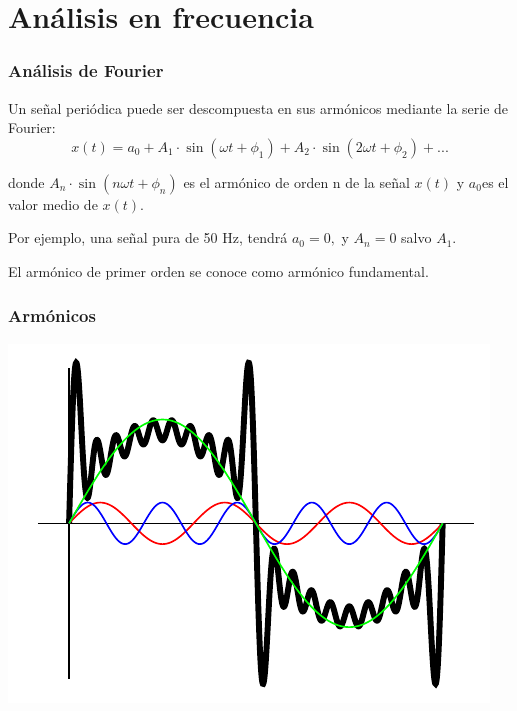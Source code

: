 \documentclass[serif, xcolor=dvipsnames]{beamer}
\begin{document}
\section{Análisis en frecuencia}

\begin{frame}
  \frametitle{Análisis de Fourier}

  Un señal periódica puede ser descompuesta en sus armónicos mediante
  la serie de Fourier:
  \[
  x(t)=a_{0}+A_{1}\cdot\sin(\omega t+\phi_{1})+A_{2}\cdot\sin(2\omega
  t+\phi_{2})+...
  \]


  donde $A_{n}\cdot\sin(n\omega t+\phi_{n})$ es el armónico de orden n
  de la señal $x(t)$ y $a_{0}$es el valor medio de $x(t)$.

  Por ejemplo, una señal pura de 50 Hz, tendrá $a_{0}=0,$ y $A_{n}=0$
  salvo $A_{1}$.

  El armónico de primer orden se conoce como armónico fundamental.


\end{frame}
\begin{frame}
  \frametitle{Armónicos}

  \begin{center}
    \includegraphics{../figs/Armonicos}
    \par\end{center}


\end{frame}
\end{document}
